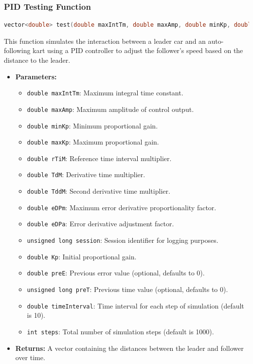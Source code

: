\documentclass[a4paper,12pt]{./article}
\begin{document}
\subsubsection{PID Testing Function}
\begin{lstlisting}[language=C++]
vector<double> test(double maxIntTm, double maxAmp, double minKp, double maxKp, double rTiM, double TdM, double TddM, double eDPm, double eDPa, unsigned long session, double Kp, double preE = 0, unsigned long preT = 0, double timeInterval = 10, int steps = 1000)
\end{lstlisting}
This function simulates the interaction between a leader car and an auto-following kart using a PID controller to adjust the follower's speed based on the distance to the leader.
\begin{itemize}
\item \textbf{Parameters:}
\begin{itemize}
\item \texttt{double maxIntTm}: Maximum integral time constant.
\item \texttt{double maxAmp}: Maximum amplitude of control output.
\item \texttt{double minKp}: Minimum proportional gain.
\item \texttt{double maxKp}: Maximum proportional gain.
\item \texttt{double rTiM}: Reference time interval multiplier.
\item \texttt{double TdM}: Derivative time multiplier.
\item \texttt{double TddM}: Second derivative time multiplier.
\item \texttt{double eDPm}: Maximum error derivative proportionality factor.
\item \texttt{double eDPa}: Error derivative adjustment factor.
\item \texttt{unsigned long session}: Session identifier for logging purposes.
\item \texttt{double Kp}: Initial proportional gain.
\item \texttt{double preE}: Previous error value (optional, defaults to 0).
\item \texttt{unsigned long preT}: Previous time value (optional, defaults to 0).
\item \texttt{double timeInterval}: Time interval for each step of simulation (default is 10).
\item \texttt{int steps}: Total number of simulation steps (default is 1000).
\end{itemize}
\item \textbf{Returns:} A vector containing the distances between the leader and follower over time.
\end{itemize}
\end{document}
